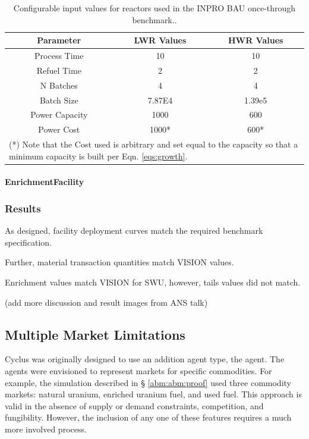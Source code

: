 \begin{table}[h]
\centering
\begin{tabular}{ccc}
Parameter      & LWR Values & HWR Values               \\ \hline
Process Time   & 10         & 10                       \\
Refuel Time    & 2          & 2                        \\
N Batches      & 4          & 4                        \\
Batch Size     & 7.87E4     & 1.39e5                   \\
Power Capacity & 1000       & 600                      \\
Power Cost     & 1000*      & 600* \\ \hline
\multicolumn{3}{l}{(*) Note that the Cost used is arbitrary and set equal to the
  capacity so that a minimum capacity is built per Eqn. \ref{eqs:growth}.}
\end{tabular}
\caption{Configurable input values for reactors used in the INPRO BAU once-through benchmark..}
\label{tbl:inprorxtr}
\end{table}

\paragraph{EnrichmentFacility}

\subsubsection{Results}

As designed, facility deployment curves match the required benchmark specification. 

Further, material transaction quantities match VISION values.

Enrichment values match VISION for SWU, however, tails values did not match.

(add more discussion and result images from ANS talk)

\subsection{Multiple Market Limitations}\label{abm:abm:limits}

Cyclus was originally designed to use an addition agent type, the 
agent. The  agents were envisioned to represent markets for
specific commodities. For example, the simulation described in \S
\ref{abm:abm:proof} used three commodity markets: natural uranium, enriched
uranium fuel, and used fuel. This approach is valid in the absence of supply or
demand constraints, competition, and fungibility. However, the inclusion of any
one of these features requires a much more involved process.

